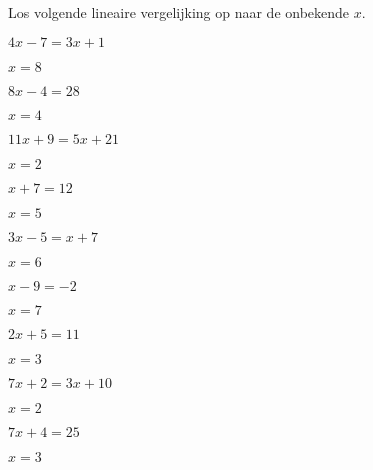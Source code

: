\documentclass{ximera}
\begin{document}
\begin{exercise} Los volgende lineaire vergelijking op naar de onbekende \(x\).
\begin{xmmulticols}
  
  
  \begin{question} \( 4x - 7  =  3x + 1     \) \begin{oplossing} \( x  = 8  \) \end{oplossing} \end{question}
  \begin{question} \( 8x - 4  =  28         \) \begin{oplossing} \( x  = 4  \) \end{oplossing} \end{question}
  \begin{question} \( 11x + 9 =  5x + 21    \) \begin{oplossing} \( x  = 2  \) \end{oplossing} \end{question}
  \begin{question} \( x + 7   =  12         \) \begin{oplossing} \( x  = 5  \) \end{oplossing} \end{question}
  \begin{question} \( 3x - 5  =  x + 7      \) \begin{oplossing} \( x  = 6  \) \end{oplossing} \end{question}
  \begin{question} \( x - 9   =  -2         \) \begin{oplossing} \( x  = 7  \) \end{oplossing} \end{question}
  \begin{question} \( 2x + 5  =  11         \) \begin{oplossing} \( x  = 3  \) \end{oplossing} \end{question}
  \begin{question} \( 7x + 2  =  3x + 10    \) \begin{oplossing} \( x  = 2  \) \end{oplossing} \end{question}
  \begin{question} \( 7x + 4  =  25         \) \begin{oplossing} \( x  = 3  \) \end{oplossing} \end{question}

\end{xmmulticols}
\end{exercise}
\end{document}
